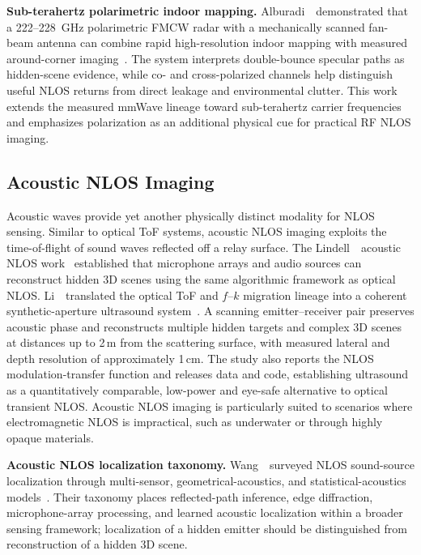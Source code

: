 \vspace{0.8mm}
\noindent \textbf{Sub-terahertz polarimetric indoor mapping.}
Alburadi~\etal~demonstrated that a 222--228~GHz polarimetric FMCW radar with a mechanically scanned fan-beam antenna can combine rapid high-resolution indoor mapping with measured around-corner imaging~\cite{alburadiPolarimetricRadarNLOS2025}. The system interprets double-bounce specular paths as hidden-scene evidence, while co- and cross-polarized channels help distinguish useful NLOS returns from direct leakage and environmental clutter. This work extends the measured mmWave lineage toward sub-terahertz carrier frequencies and emphasizes polarization as an additional physical cue for practical RF NLOS imaging.

\subsection{Acoustic NLOS Imaging}
Acoustic waves provide yet another physically distinct modality for NLOS sensing. Similar to optical ToF systems, acoustic NLOS imaging exploits the time-of-flight of sound waves reflected off a relay surface. The Lindell~\etal~acoustic NLOS work~\cite{Lindell:2019:Acoustic} established that microphone arrays and audio sources can reconstruct hidden 3D scenes using the same algorithmic framework as optical NLOS. Li~\etal~translated the optical ToF and $f$--$k$ migration lineage into a coherent synthetic-aperture ultrasound system~\cite{ultrasoundNLOS2025}. A scanning emitter--receiver pair preserves acoustic phase and reconstructs multiple hidden targets and complex 3D scenes at distances up to 2\,m from the scattering surface, with measured lateral and depth resolution of approximately 1\,cm. The study also reports the NLOS modulation-transfer function and releases data and code, establishing ultrasound as a quantitatively comparable, low-power and eye-safe alternative to optical transient NLOS. Acoustic NLOS imaging is particularly suited to scenarios where electromagnetic NLOS is impractical, such as underwater or through highly opaque materials.

\vspace{0.8mm}
\noindent \textbf{Acoustic NLOS localization taxonomy.}
Wang~\etal~surveyed NLOS sound-source localization through multi-sensor, geometrical-acoustics, and statistical-acoustics models~\cite{wangAcousticNLOSLocalizationReview2026}. Their taxonomy places reflected-path inference, edge diffraction, microphone-array processing, and learned acoustic localization within a broader sensing framework; localization of a hidden emitter should be distinguished from reconstruction of a hidden 3D scene.

